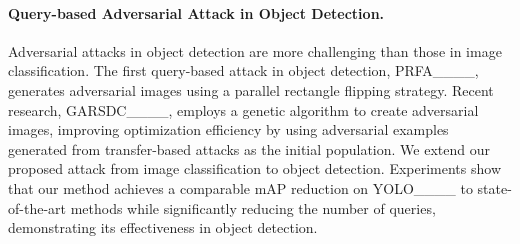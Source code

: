 \paragraph{Query-based Adversarial Attack in Object Detection.} 
Adversarial attacks in object detection are more challenging than those in image classification. The first query-based attack in object detection, PRFA____, generates adversarial images using a parallel rectangle flipping strategy. Recent research, GARSDC____, employs a genetic algorithm to create adversarial images, improving optimization efficiency by using adversarial examples generated from transfer-based attacks as the initial population. We extend our proposed attack from image classification to object detection. Experiments show that our method achieves a comparable mAP reduction on YOLO____ to state-of-the-art methods while significantly reducing the number of queries, demonstrating its effectiveness in object detection.